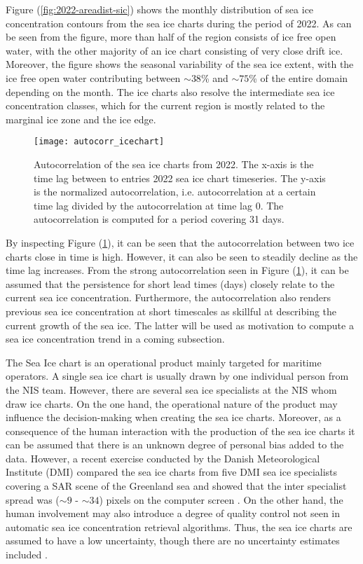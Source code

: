 \documentclass[../main/thesis.tex]{subfiles}
\begin{document}
Figure (\ref{fig:2022-areadist-sic}) shows the monthly distribution of sea ice concentration contours from the sea ice charts during the period of 2022. As can be seen from the figure, more than half of the region consists of ice free open water, with the other majority of an ice chart consisting of very close drift ice. Moreover, the figure shows the seasonal variability of the sea ice extent, with the ice free open water contributing between $\sim38$\% and $\sim75$\% of the entire domain depending on the month. The ice charts also resolve the intermediate sea ice concentration classes, which for the current region is mostly related to the marginal ice zone and the ice edge.

\begin{figure}
    \centering
    \texttt{[image: autocorr\_icechart]}
    \caption{\label{fig:autocorr}Autocorrelation of the sea ice charts from 2022. The x-axis is the time lag between to entries 2022 sea ice chart timeseries. The y-axis is the normalized autocorrelation, i.e. autocorrelation at a certain time lag divided by the autocorrelation at time lag 0. The autocorrelation is computed for a period covering 31 days.}
\end{figure}

By inspecting Figure (\ref{fig:autocorr}), it can be seen that the autocorrelation between two ice charts close in time is high. However, it can also be seen to steadily decline as the time lag increases. From the strong autocorrelation seen in Figure (\ref{fig:autocorr}), it can be assumed that the persistence for short lead times (days) closely relate to the current sea ice concentration. Furthermore, the autocorrelation also renders previous sea ice concentration at short timescales as skillful at describing the current growth of the sea ice. The latter will be used as motivation to compute a sea ice concentration trend in a coming subsection.

The Sea Ice chart is an operational product mainly targeted for maritime operators. A single sea ice chart is usually drawn by one individual person from the NIS team. However, there are several sea ice specialists at the NIS whom draw ice charts. On the one hand, the operational nature of the product may influence the decision-making when creating the sea ice charts. Moreover, as a consequence of the human interaction with the production of the sea ice charts it can be assumed that there is an unknown degree of personal bias added to the data. However, a recent exercise conducted by the Danish Meteorological Institute (DMI) compared the sea ice charts from five DMI sea ice specialists covering a SAR scene of the Greenland sea and showed that the inter specialist spread was ($\sim9$ - $\sim34$) pixels on the computer screen \citep{Kreiner2023}. On the other hand, the human involvement may also introduce a degree of quality control not seen in automatic sea ice concentration retrieval algorithms. Thus, the sea ice charts are assumed to have a low uncertainty, though there are no uncertainty estimates included \citep{Dinessen2020}.
\end{document}
